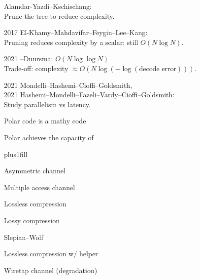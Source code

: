 \documentclass[12pt, aspectratio=169]{beamer}
\begin{document}
\begin{frame}
    \fontsize{16pt}{16pt} Alamdar-Yazdi--Kschischang: \\
	Prune the tree to reduce complexity.

    \vskip0.5cm
    
	2017 El-Khamy--Mahdavifar--Feygin--Lee--Kang: \\
    Pruning reduces complexity by a scalar; 
	still $O(N \log N)$.
    
    \vskip0.5cm

	2021 \WW--Duursma:
	$O(N \log \log N)$ \\
	Trade-off: complexity
    $\approx O(N\log(-\log(\text{decode error})))$.

    \vskip0.5cm

	2021 Mondelli--Hashemi--Cioffi--Goldsmith, \\
	2021 Hashemi--Mondelli--Fazeli--Vardy--Cioffi--Goldsmith: \\
    Study parallelism vs latency.
\end{frame}

\begin{frame}
    \fontsize{32pt}{0}\selectfont
    
    Polar code is a mathy code
    
    \pause
    \vfill
    
    \fontsize{28pt}{0}\selectfont
    Polar achieves the capacity of
\end{frame}

\begin{frame}
    \ifforloop
        \def\n{100}
    \else
        \def\n{10}
    \fi

    \fontsize{16pt}{0}\selectfont
    \parskip0pt plus1fill

	Asymmetric channel

	Multiple access channel

    Lossless compression

	Lossy compression

	Slepian--Wolf

	Lossless compression w/ helper

	Wiretap channel (degradation)
\end{frame}
\end{document}
